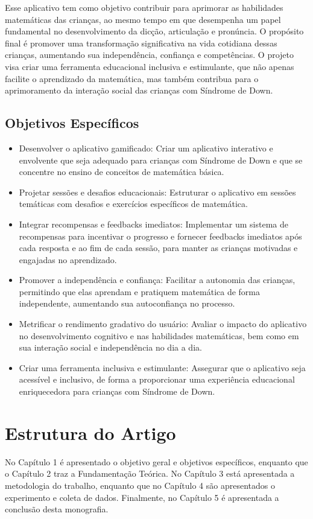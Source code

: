  Esse aplicativo tem como objetivo contribuir para aprimorar as habilidades matemáticas das crianças, ao mesmo tempo em que desempenha um papel fundamental no desenvolvimento da dicção, articulação e pronúncia. O propósito final é promover uma transformação significativa na vida cotidiana dessas crianças, aumentando sua independência, confiança e competências. O projeto visa criar uma ferramenta educacional inclusiva e estimulante, que não apenas facilite o aprendizado da matemática, mas também contribua para o aprimoramento da interação social das crianças com Síndrome de Down.

\subsection{Objetivos Específicos}

\begin{itemize}
\item{Desenvolver o aplicativo gamificado: Criar um aplicativo interativo e envolvente que seja adequado para crianças com Síndrome de Down e que se concentre no ensino de conceitos de matemática básica.}
\item {Projetar sessões e desafios educacionais: Estruturar o aplicativo em sessões temáticas com desafios e exercícios específicos de matemática.} 
\item {Integrar recompensas e feedbacks imediatos: Implementar um sistema de recompensas para incentivar o progresso e fornecer feedbacks imediatos após cada resposta e ao fim de cada sessão, para manter as crianças motivadas e engajadas no aprendizado. }  
\item {Promover a independência e confiança: Facilitar a autonomia das crianças, permitindo que elas aprendam e pratiquem matemática de forma independente, aumentando sua autoconfiança no processo.}
\item {Metrificar o rendimento gradativo do usuário: Avaliar o impacto do aplicativo no desenvolvimento cognitivo e nas habilidades matemáticas, bem como em sua interação social e independência no dia a dia.}
\item {Criar uma ferramenta inclusiva e estimulante: Assegurar que o aplicativo seja acessível e inclusivo, de forma a proporcionar uma experiência educacional enriquecedora para crianças com Síndrome de Down.}
\end{itemize}

\section{Estrutura do Artigo}

No Capítulo 1 é apresentado o objetivo geral e objetivos específicos, enquanto que o Capítulo 2 traz a Fundamentação Teórica. No Capítulo 3 está apresentada a metodologia do trabalho, enquanto que no Capítulo 4 são apresentados o experimento e coleta de dados. Finalmente, no Capítulo 5 é apresentada a conclusão desta monografia.


